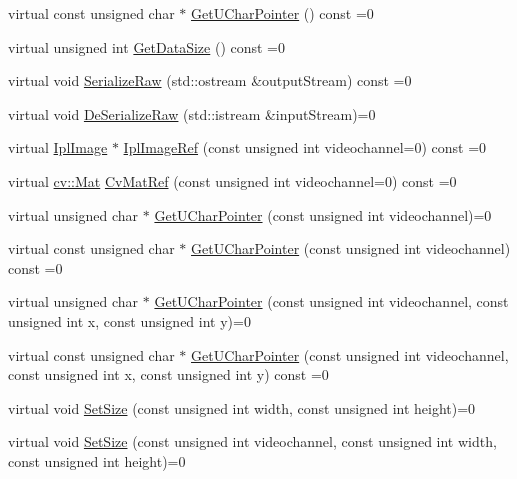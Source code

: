 \begin{DoxyCompactItemize}
\item 
virtual const unsigned char $\ast$ \hyperlink{classsvl_sample_image_a4527d6f63176444867741956c3fa902d}{Get\-U\-Char\-Pointer} () const =0
\item 
virtual unsigned int \hyperlink{classsvl_sample_image_a06557dd28b342027873fe82d4ca81196}{Get\-Data\-Size} () const =0
\item 
virtual void \hyperlink{classsvl_sample_image_ac8f36bed025509c4d9c77060413d9ece}{Serialize\-Raw} (std\-::ostream \&output\-Stream) const =0
\item 
virtual void \hyperlink{classsvl_sample_image_a377e3cc76c0a426b3acaae6f3a835723}{De\-Serialize\-Raw} (std\-::istream \&input\-Stream)=0
\item 
virtual \hyperlink{svl_types_8h_aa5a40a13021ba9708bfe921e18fdfa53}{Ipl\-Image} $\ast$ \hyperlink{classsvl_sample_image_a186f2ed3f98059785a8ec9de5dd55ec6}{Ipl\-Image\-Ref} (const unsigned int videochannel=0) const =0
\item 
virtual \hyperlink{namespacecv_a60d81b54f4914bec4cc4a72ab77eb444}{cv\-::\-Mat} \hyperlink{classsvl_sample_image_a6f6b8f9491bb9effdda7a42023208b9f}{Cv\-Mat\-Ref} (const unsigned int videochannel=0) const =0
\item 
virtual unsigned char $\ast$ \hyperlink{classsvl_sample_image_a197092f84532696829338eeef8c961fb}{Get\-U\-Char\-Pointer} (const unsigned int videochannel)=0
\item 
virtual const unsigned char $\ast$ \hyperlink{classsvl_sample_image_aa5e8009157462ed2b4a2b9a6733057b7}{Get\-U\-Char\-Pointer} (const unsigned int videochannel) const =0
\item 
virtual unsigned char $\ast$ \hyperlink{classsvl_sample_image_a5290dc4e28f8e5221d745bdf11523168}{Get\-U\-Char\-Pointer} (const unsigned int videochannel, const unsigned int x, const unsigned int y)=0
\item 
virtual const unsigned char $\ast$ \hyperlink{classsvl_sample_image_a75e4980f2dbffab07a44da67fdf1f3d6}{Get\-U\-Char\-Pointer} (const unsigned int videochannel, const unsigned int x, const unsigned int y) const =0
\item 
virtual void \hyperlink{classsvl_sample_image_a7092189a385c234da3d96dce9fe8958a}{Set\-Size} (const unsigned int width, const unsigned int height)=0
\item 
virtual void \hyperlink{classsvl_sample_image_a2bb1c673c435a89029fb0809cc740e0d}{Set\-Size} (const unsigned int videochannel, const unsigned int width, const unsigned int height)=0
\item 

\end{DoxyCompactItemize}
